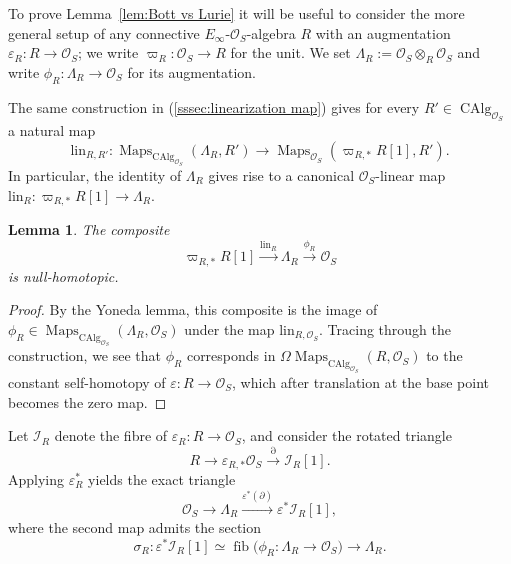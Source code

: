 \documentclass[12pt, oneside]{amsart}
\numberwithin{equation}{section}
\newtheorem{lemma}[subsubsection]{Lemma}
\theoremstyle{remark}
\theoremstyle{plain}
\DeclareMathOperator{\Map}{Maps}
\newcommand{\lam}{\Lambda}
\newcommand{\OO}{\mathcal{O}}
\newcommand{\CAlg}{\operatorname{CAlg}}
\newcommand{\eps}{\varepsilon}
\begin{document}
\subsubsection{}

To prove Lemma~\ref{lem:Bott vs Lurie} it will be useful to consider the more general setup of any connective $E_\infty$-$\OO_S$-algebra $R$ with an augmentation $\eps_R : R \to \OO_S$; we write $\varpi_R : \OO_S \to R$ for the unit.
We set $\lam_R := \OO_S \otimes_R \OO_S$ and write $\phi_R : \lam_R \to \OO_S$ for its augmentation.

The same construction in (\ref{sssec:linearization map}) gives for every $R' \in \CAlg_{\OO_S}$ a natural map
\[
  \mathrm{lin}_{R,R'} : \Map_{\CAlg_{\OO_S}}(\lam_R, R')
  \to \Map_{\OO_S}(\varpi_{R,*} R[1], R').
\]
In particular, the identity of $\lam_R$ gives rise to a canonical $\OO_S$-linear map $\mathrm{lin}_R : \varpi_{R,*} R[1] \to \lam_R$.

\begin{lemma}\label{lem:phi lin null}
  The composite
  \[
    \varpi_{R,*} R [1]
    \xrightarrow{\mathrm{lin}_R} \lam_R
    \xrightarrow{\phi_R} \OO_S
  \]
  is null-homotopic.
\end{lemma}
\begin{proof}
  By the Yoneda lemma, this composite is the image of $\phi_R \in \Map_{\CAlg_{\OO_S}}(\lam_R, \OO_S)$ under the map $\mathrm{lin}_{R,\OO_S}$.
  Tracing through the construction, we see that $\phi_R$ corresponds in $\Omega \Map_{\CAlg_{\OO_S}}(R, \OO_S)$ to the constant self-homotopy of $\eps : R \to \OO_S$, which after translation at the base point becomes the zero map.
\end{proof}

Let $\mathcal{I}_R$ denote the fibre of $\eps_R : R \to \OO_S$, and consider the rotated triangle
\[
  R \to \eps_{R,*} \OO_S \xrightarrow{\partial} \mathcal{I}_R[1].
\]
Applying $\eps_R^*$ yields the exact triangle
\[
  \OO_S \to \lam_R \xrightarrow{\eps^*(\partial)} \eps^*\mathcal{I}_R[1],
\]
where the second map admits the section
\begin{equation*}
  \sigma_R : \eps^*\mathcal{I}_R[1]
  \simeq \operatorname{fib}\bigl(\phi_R : \lam_R \to \OO_S\bigr)
  \longrightarrow \lam_R.
\end{equation*}
\end{document}
